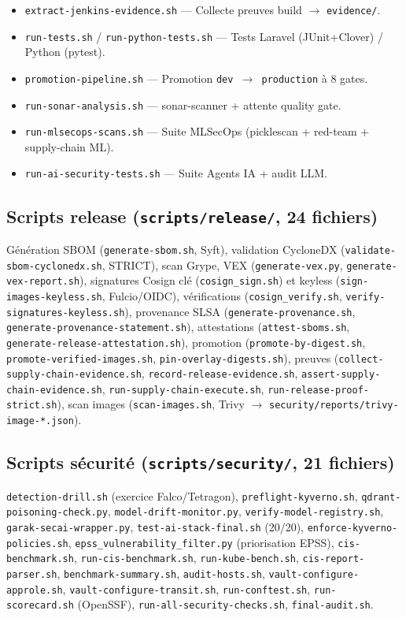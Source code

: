 \documentclass[12pt,a4paper,openany]{report}
\begin{document}
\begin{itemize}
  \item \texttt{extract-jenkins-evidence.sh} — Collecte preuves build $\rightarrow$ \texttt{evidence/}.
  \item \texttt{run-tests.sh} / \texttt{run-python-tests.sh} — Tests Laravel (JUnit+Clover) / Python (pytest).
  \item \texttt{promotion-pipeline.sh} — Promotion \texttt{dev $\rightarrow$ production} à 8 gates.
  \item \texttt{run-sonar-analysis.sh} — sonar-scanner + attente quality gate.
  \item \texttt{run-mlsecops-scans.sh} — Suite MLSecOps (picklescan + red-team + supply-chain ML).
  \item \texttt{run-ai-security-tests.sh} — Suite Agents IA + audit LLM.
\end{itemize}

\subsection{Scripts release (\texttt{scripts/release/}, 24 fichiers)}

Génération SBOM (\texttt{generate-sbom.sh}, Syft), validation CycloneDX
(\texttt{validate-sbom-cyclonedx.sh}, STRICT), scan Grype, VEX
(\texttt{generate-vex.py}, \texttt{generate-vex-report.sh}),
signatures Cosign clé (\texttt{cosign\_sign.sh}) et keyless
(\texttt{sign-images-keyless.sh}, Fulcio/OIDC), vérifications
(\texttt{cosign\_verify.sh}, \texttt{verify-signatures-keyless.sh}),
provenance SLSA (\texttt{generate-provenance.sh}, \texttt{generate-provenance-statement.sh}),
attestations (\texttt{attest-sboms.sh}, \texttt{generate-release-attestation.sh}),
promotion (\texttt{promote-by-digest.sh}, \texttt{promote-verified-images.sh},
\texttt{pin-overlay-digests.sh}), preuves (\texttt{collect-supply-chain-evidence.sh},
\texttt{record-release-evidence.sh}, \texttt{assert-supply-chain-evidence.sh},
\texttt{run-supply-chain-execute.sh}, \texttt{run-release-proof-strict.sh}),
scan images (\texttt{scan-images.sh}, Trivy $\rightarrow$ \texttt{security/reports/trivy-image-*.json}).

\subsection{Scripts sécurité (\texttt{scripts/security/}, 21 fichiers)}

\texttt{detection-drill.sh} (exercice Falco/Tetragon),
\texttt{preflight-kyverno.sh}, \texttt{qdrant-poisoning-check.py},
\texttt{model-drift-monitor.py}, \texttt{verify-model-registry.sh},
\texttt{garak-secai-wrapper.py}, \texttt{test-ai-stack-final.sh} (20/20),
\texttt{enforce-kyverno-policies.sh}, \texttt{epss\_vulnerability\_filter.py} (priorisation EPSS),
\texttt{cis-benchmark.sh}, \texttt{run-cis-benchmark.sh}, \texttt{run-kube-bench.sh},
\texttt{cis-report-parser.sh}, \texttt{benchmark-summary.sh}, \texttt{audit-hosts.sh},
\texttt{vault-configure-approle.sh}, \texttt{vault-configure-transit.sh},
\texttt{run-conftest.sh}, \texttt{run-scorecard.sh} (OpenSSF),
\texttt{run-all-security-checks.sh}, \texttt{final-audit.sh}.
\end{document}
